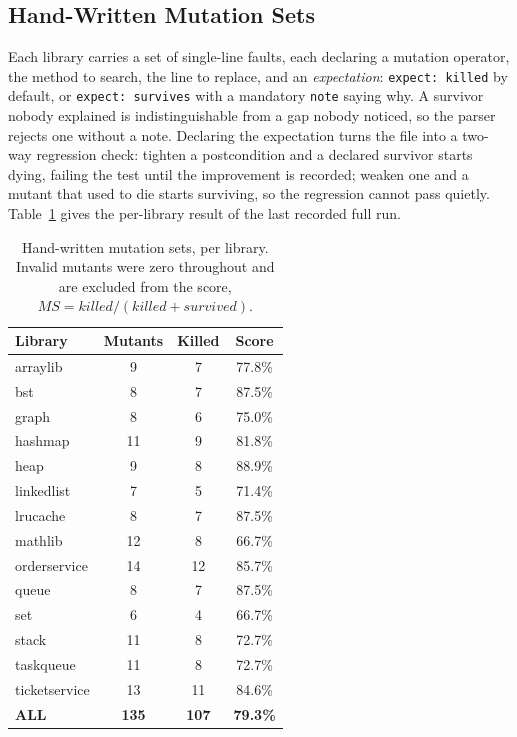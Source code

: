 \documentclass[conference]{IEEEtran}
\begin{document}
\subsection{Hand-Written Mutation Sets}

Each library carries a set of single-line faults, each declaring a mutation operator,
the method to search, the line to replace, and an \emph{expectation}:
\texttt{expect: killed} by default, or \texttt{expect: survives} with a mandatory
\texttt{note} saying why. A survivor nobody explained is indistinguishable from a gap
nobody noticed, so the parser rejects one without a note. Declaring the expectation
turns the file into a two-way regression check: tighten a postcondition and a declared
survivor starts dying, failing the test until the improvement is recorded; weaken one
and a mutant that used to die starts surviving, so the regression cannot pass quietly.
Table~\ref{tab:perlib} gives the per-library result of the last recorded full run.

\begin{table}[h]
\centering
\caption{Hand-written mutation sets, per library. Invalid mutants were zero throughout
and are excluded from the score, $\mathit{MS}=\mathit{killed}/(\mathit{killed}+\mathit{survived})$.}
\label{tab:perlib}
\begin{tabular}{|l|c|c|c|}
\hline
\textbf{Library} & \textbf{Mutants} & \textbf{Killed} & \textbf{Score} \\
\hline
arraylib & 9 & 7 & 77.8\% \\
\hline
bst & 8 & 7 & 87.5\% \\
\hline
graph & 8 & 6 & 75.0\% \\
\hline
hashmap & 11 & 9 & 81.8\% \\
\hline
heap & 9 & 8 & 88.9\% \\
\hline
linkedlist & 7 & 5 & 71.4\% \\
\hline
lrucache & 8 & 7 & 87.5\% \\
\hline
mathlib & 12 & 8 & 66.7\% \\
\hline
orderservice & 14 & 12 & 85.7\% \\
\hline
queue & 8 & 7 & 87.5\% \\
\hline
set & 6 & 4 & 66.7\% \\
\hline
stack & 11 & 8 & 72.7\% \\
\hline
taskqueue & 11 & 8 & 72.7\% \\
\hline
ticketservice & 13 & 11 & 84.6\% \\
\hline
\textbf{ALL} & \textbf{135} & \textbf{107} & \textbf{79.3\%} \\
\hline
\end{tabular}
\end{table}
\end{document}

